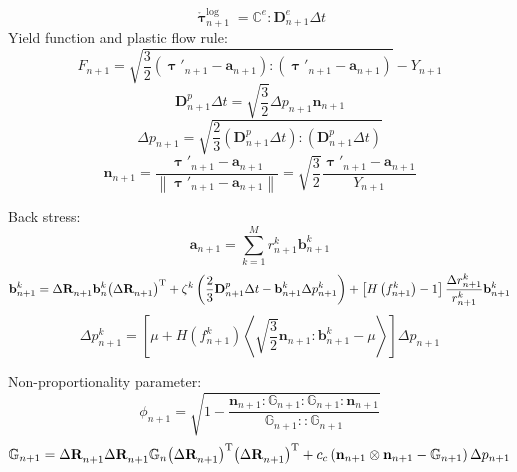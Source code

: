 \begin{equation}
\label{Equ:sigman+1}
\mathring {\bm{\uptau}}_{n + 1}^{\log } = {\mathbb{C}^e}:{\mathbf{D}}_{n + 1}^e\Delta t
\end{equation}
Yield function and plastic flow rule:
\begin{equation}
\label{Equ:Fn+1}
{F_{n + 1}} = \sqrt {\frac{3}{2}\left( {{{\bm{\uptau}}'_{n + 1}} - {{\mathbf{a}}_{n + 1}}} \right):\left( {{{\bm{\uptau}}'_{n + 1}} - {{\mathbf{a}}_{n + 1}}} \right)}  - {Y_{n + 1}}
\end{equation}
\begin{equation}
\label{Equ:epsilonpn+1}
{\mathbf{D}}_{n + 1}^p\Delta t = \sqrt {\frac{3}{2}} \Delta {p_{n + 1}}{{\mathbf{n}}_{n + 1}}
\end{equation}
\begin{equation}
\label{Equ:pn+1}
\Delta {p_{n + 1}} = \sqrt {\frac{2}{3} \left({\mathbf{D}}_{n + 1}^p\Delta t\right):\left({\mathbf{D}}_{n + 1}^p\Delta t\right)}
\end{equation}
\begin{equation}
\label{Equ:nn+1}
{{\mathbf{n}}_{n + 1}} = \frac{{{{\bm{\uptau}'}_{n + 1}} - {{\mathbf{a}}_{n + 1}}}}{{\left\| {{{\bm{\uptau}'}_{n + 1}} - {{\mathbf{a}}_{n + 1}}} \right\|}} = \sqrt {\frac{3}{2}} \frac{{{{\bm{\uptau}'}_{n + 1}} - {{\mathbf{a}}_{n + 1}}}}{{{Y_{n + 1}}}}
\end{equation}

Back stress:
\begin{equation}
\label{Equ:an+1}
{{\mathbf{a}}_{n + 1}} = \sum\limits_{k = 1}^M {r_{n + 1}^k{\mathbf{b}}_{n + 1}^k}
\end{equation}
\begin{equation}
{{\mathbf{b}}_{n + 1}^k = \Delta {\mathbf{R}}_{n + 1}^{} {\mathbf{b}}_n^k {\left( {\Delta {\mathbf{R}}_{n + 1}^{}} \right)^{\rm{T}}} + {\zeta ^k}\left( {\frac{2}{3} {{\mathbf{D}}_{n + 1}^p\Delta t} - {\mathbf{b}}_{n + 1}^k\Delta p_{n + 1}^k} \right) + \left[ {H\left( {f_{n + 1}^k} \right) - 1} \right]{\frac{{\Delta r_{n + 1}^k}}{{r_{n + 1}^k}}{\mathbf{b}}_{n + 1}^k}}
\end{equation}
\begin{equation}
\Delta p_{n + 1}^k = \left[ {\mu  + H\left( {f_{n + 1}^k} \right)\left\langle {\sqrt {\frac{3}{2}} {{\mathbf{n}}_{n + 1}}:{\mathbf{b}}_{n + 1}^k - \mu } \right\rangle } \right]\Delta {p_{n + 1}}
\end{equation}

Non-proportionality parameter:
\begin{equation}
{\phi _{n + 1}} = \sqrt {1 - \frac{{{{\mathbf{n}}_{n + 1}}:{\mathbb{G}_{n + 1}}:{\mathbb{G}_{n + 1}}:{{\mathbf{n}}_{n + 1}}}}{{{\mathbb{G}_{n + 1}}::{\mathbb{G}_{n + 1}}}}}
\end{equation}
\begin{equation}
{\mathbb{G}_{n + 1}} = \Delta {\mathbf{R}}_{n + 1}^{} \Delta {\mathbf{R}}_{n + 1}^{} {\mathbb{G}_{n}} {\left( {\Delta {\mathbf{R}}_{n + 1}^{}} \right)^{\rm{T}}} {\left( {\Delta {\mathbf{R}}_{n + 1}^{}} \right)^{\rm{T}}} + {c_c}\left( {{{\mathbf{n}}_{n + 1}} \otimes {{\mathbf{n}}_{n + 1}} - {\mathbb{G}_{n + 1}}} \right)\Delta {p_{n + 1}}
\end{equation}

